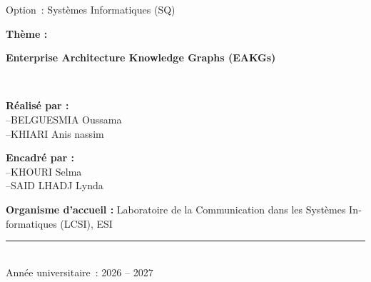 \begin{titlepage}
\begin{french}
{\large Option~: Systèmes Informatiques (SQ)\\}
\vspace{1cm}

\begin{center}

\begin{minipage}{0.9\linewidth}
\centering
{\Large \textbf{Thème :}\par}
{\Large\bfseries Enterprise Architecture Knowledge Graphs (EAKGs)\par}

\end{minipage}

\end{center}
\vspace{3cm}

\ \begin{minipage}[t]{0.45\textwidth}
        \begin{flushleft} \large
            \textbf{Réalisé par :}\\
            \vspace{0.2cm}
            --BELGUESMIA Oussama \\
            --KHIARI Anis nassim
        \end{flushleft}
    \end{minipage}
    \hfill
    \begin{minipage}[t]{0.45\textwidth}
        \begin{flushleft} \large
            \textbf{Encadré par :}\\
            \vspace{0.2cm}
                --KHOURI Selma\\
                --SAID LHADJ Lynda
        \end{flushleft}
    \end{minipage}\par\vspace{1cm}

    \begin{flushleft} \large
        \textbf{Organisme d'accueil :} Laboratoire de la Communication dans les Systèmes Informatiques (LCSI), ESI
    \end{flushleft}

    \vfill  
    \rule{0.75\linewidth}{0.3mm} \\[0.5cm]
        {\large Année universitaire~: 2026 -- 2027}\\[1.5cm]
    
\end{french}
\end{titlepage}
